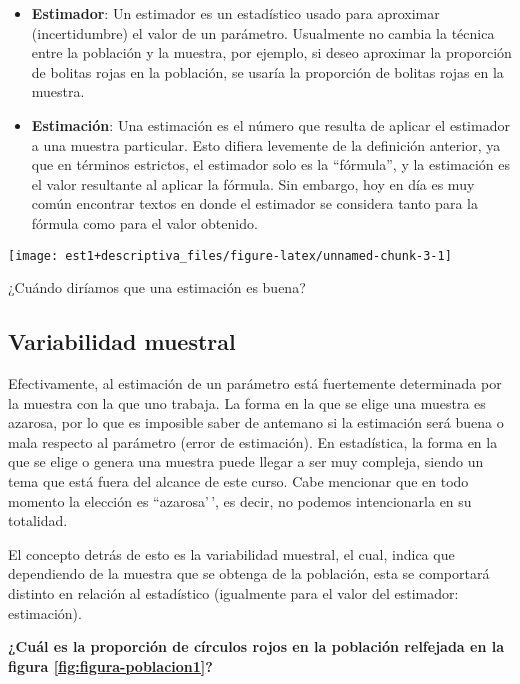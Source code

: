 \documentclass[
]{book}
\providecommand{\tightlist}{%
  \setlength{\itemsep}{0pt}\setlength{\parskip}{0pt}}
\theoremstyle{definition}
\theoremstyle{definition}
\theoremstyle{definition}
\theoremstyle{definition}
\theoremstyle{remark}
\begin{document}
\begin{itemize}
\tightlist
\item
  \textbf{Estimador}: Un estimador es un estadístico usado para aproximar (incertidumbre) el valor de un parámetro. Usualmente no cambia la técnica entre la población y la muestra, por ejemplo, si deseo aproximar la proporción de bolitas rojas en la población, se usaría la proporción de bolitas rojas en la muestra.
\item
  \textbf{Estimación}: Una estimación es el número que resulta de aplicar el estimador a una muestra particular. Esto difiera levemente de la definición anterior, ya que en términos estrictos, el estimador solo es la ``fórmula'', y la estimación es el valor resultante al aplicar la fórmula. Sin embargo, hoy en día es muy común encontrar textos en donde el estimador se considera tanto para la fórmula como para el valor obtenido.
\end{itemize}

\begin{center}\texttt{[image: est1+descriptiva\_files/figure-latex/unnamed-chunk-3-1]} \end{center}

¿Cuándo diríamos que una estimación es buena?

\hypertarget{variabilidad-muestral}{%
\subsection*{Variabilidad muestral}\label{variabilidad-muestral}}

Efectivamente, al estimación de un parámetro está fuertemente determinada por la muestra con la que uno trabaja. La forma en la que se elige una muestra es azarosa, por lo que es imposible saber de antemano si la estimación será buena o mala respecto al parámetro (error de estimación). En estadística, la forma en la que se elige o genera una muestra puede llegar a ser muy compleja, siendo un tema que está fuera del alcance de este curso. Cabe mencionar que en todo momento la elección es ``azarosa'\,', es decir, no podemos intencionarla en su totalidad.

El concepto detrás de esto es la variabilidad muestral, el cual, indica que dependiendo de la muestra que se obtenga de la población, esta se comportará distinto en relación al estadístico (igualmente para el valor del estimador: estimación).

\textbf{¿Cuál es la proporción de círculos rojos en la población relfejada en la figura \ref{fig:figura-poblacion1}?}
\end{document}
